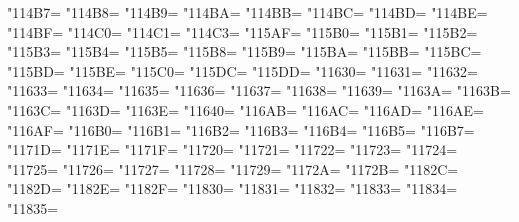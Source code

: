 \XeTeXcharclass"114B7=\KclassCM
\XeTeXcharclass"114B8=\KclassCM
\XeTeXcharclass"114B9=\KclassCM
\XeTeXcharclass"114BA=\KclassCM
\XeTeXcharclass"114BB=\KclassCM
\XeTeXcharclass"114BC=\KclassCM
\XeTeXcharclass"114BD=\KclassCM
\XeTeXcharclass"114BE=\KclassCM
\XeTeXcharclass"114BF=\KclassCM
\XeTeXcharclass"114C0=\KclassCM
\XeTeXcharclass"114C1=\KclassCM
\XeTeXcharclass"114C3=\KclassCM
\XeTeXcharclass"115AF=\KclassCM
\XeTeXcharclass"115B0=\KclassCM
\XeTeXcharclass"115B1=\KclassCM
\XeTeXcharclass"115B2=\KclassCM
\XeTeXcharclass"115B3=\KclassCM
\XeTeXcharclass"115B4=\KclassCM
\XeTeXcharclass"115B5=\KclassCM
\XeTeXcharclass"115B8=\KclassCM
\XeTeXcharclass"115B9=\KclassCM
\XeTeXcharclass"115BA=\KclassCM
\XeTeXcharclass"115BB=\KclassCM
\XeTeXcharclass"115BC=\KclassCM
\XeTeXcharclass"115BD=\KclassCM
\XeTeXcharclass"115BE=\KclassCM
\XeTeXcharclass"115C0=\KclassCM
\XeTeXcharclass"115DC=\KclassCM
\XeTeXcharclass"115DD=\KclassCM
\XeTeXcharclass"11630=\KclassCM
\XeTeXcharclass"11631=\KclassCM
\XeTeXcharclass"11632=\KclassCM
\XeTeXcharclass"11633=\KclassCM
\XeTeXcharclass"11634=\KclassCM
\XeTeXcharclass"11635=\KclassCM
\XeTeXcharclass"11636=\KclassCM
\XeTeXcharclass"11637=\KclassCM
\XeTeXcharclass"11638=\KclassCM
\XeTeXcharclass"11639=\KclassCM
\XeTeXcharclass"1163A=\KclassCM
\XeTeXcharclass"1163B=\KclassCM
\XeTeXcharclass"1163C=\KclassCM
\XeTeXcharclass"1163D=\KclassCM
\XeTeXcharclass"1163E=\KclassCM
\XeTeXcharclass"11640=\KclassCM
\XeTeXcharclass"116AB=\KclassCM
\XeTeXcharclass"116AC=\KclassCM
\XeTeXcharclass"116AD=\KclassCM
\XeTeXcharclass"116AE=\KclassCM
\XeTeXcharclass"116AF=\KclassCM
\XeTeXcharclass"116B0=\KclassCM
\XeTeXcharclass"116B1=\KclassCM
\XeTeXcharclass"116B2=\KclassCM
\XeTeXcharclass"116B3=\KclassCM
\XeTeXcharclass"116B4=\KclassCM
\XeTeXcharclass"116B5=\KclassCM
\XeTeXcharclass"116B7=\KclassCM
\XeTeXcharclass"1171D=\KclassCM
\XeTeXcharclass"1171E=\KclassCM
\XeTeXcharclass"1171F=\KclassCM
\XeTeXcharclass"11720=\KclassCM
\XeTeXcharclass"11721=\KclassCM
\XeTeXcharclass"11722=\KclassCM
\XeTeXcharclass"11723=\KclassCM
\XeTeXcharclass"11724=\KclassCM
\XeTeXcharclass"11725=\KclassCM
\XeTeXcharclass"11726=\KclassCM
\XeTeXcharclass"11727=\KclassCM
\XeTeXcharclass"11728=\KclassCM
\XeTeXcharclass"11729=\KclassCM
\XeTeXcharclass"1172A=\KclassCM
\XeTeXcharclass"1172B=\KclassCM
\XeTeXcharclass"1182C=\KclassCM
\XeTeXcharclass"1182D=\KclassCM
\XeTeXcharclass"1182E=\KclassCM
\XeTeXcharclass"1182F=\KclassCM
\XeTeXcharclass"11830=\KclassCM
\XeTeXcharclass"11831=\KclassCM
\XeTeXcharclass"11832=\KclassCM
\XeTeXcharclass"11833=\KclassCM
\XeTeXcharclass"11834=\KclassCM
\XeTeXcharclass"11835=\KclassCM
